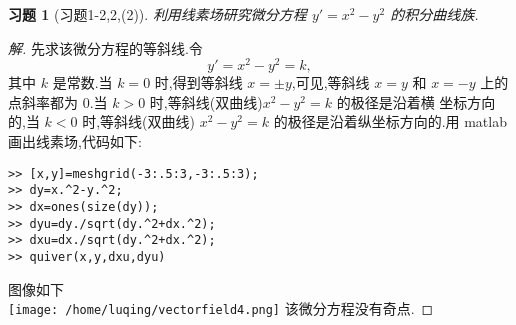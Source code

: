 \documentclass[twoside,11pt]{article}
\newtheorem*{cdtheorem}{习题}
\newenvironment{exercise}
{\begin{mdframed}[backgroundcolor=gray!40,rightline=false,leftline=false,topline=false,bottomline=false]\begin{cdtheorem}}
    {\end{cdtheorem}\end{mdframed}}
\begin{document}
\begin{exercise}[习题1-2,2,(2)]
  利用线素场研究微分方程 $y'=x^2-y^2$ 的积分曲线族.
\end{exercise}
\begin{proof}[解]
先求该微分方程的等斜线.令
$$
y'=x^2-y^2=k,
$$
其中 $k$ 是常数.当 $k=0$ 时,得到等斜线 $x=\pm y$,可见,等斜线 $x=y$ 和
$x=-y$ 上的点斜率都为 0.当 $k>0$ 时,等斜线(双曲线)$x^2-y^2=k$ 的极径是沿着横
坐标方向的,当 $k<0$ 时,等斜线(双曲线) $x^2-y^2=k$ 的极径是沿着纵坐标方向的.用 matlab 画出线素场,代码如下:
 \begin{lstlisting}
>> [x,y]=meshgrid(-3:.5:3,-3:.5:3);
>> dy=x.^2-y.^2;
>> dx=ones(size(dy));
>> dyu=dy./sqrt(dy.^2+dx.^2);
>> dxu=dx./sqrt(dy.^2+dx.^2);
>> quiver(x,y,dxu,dyu)
 \end{lstlisting}
图像如下\\
\texttt{[image: /home/luqing/vectorfield4.png]}
该微分方程没有奇点.
\end{proof}
\end{document}
